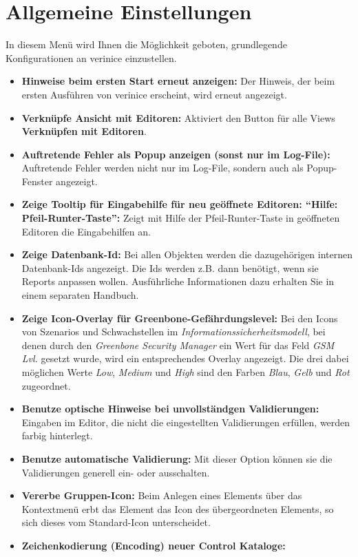 \documentclass[a4paper,10pt]{book}
\begin{document}
\section{Allgemeine Einstellungen}
In diesem Menü wird Ihnen die Möglichkeit geboten, grundlegende
Konfigurationen an verinice einzustellen.
\begin{itemize}
\item \textbf{Hinweise beim ersten Start erneut anzeigen:} Der
  Hinweis, der beim ersten Ausführen von verinice erscheint, wird
  erneut angezeigt.
\item \textbf{Verknüpfe Ansicht mit Editoren:} Aktiviert den Button
  für alle Views \textbf{Verknüpfen mit Editoren}.
\item \textbf{Auftretende Fehler als Popup anzeigen (sonst nur im
    Log-File):} Auftretende Fehler werden nicht nur im Log-File,
  sondern auch als Popup-Fenster angezeigt.
\item \textbf{Zeige Tooltip für Eingabehilfe für neu geöffnete
    Editoren: ``Hilfe: Pfeil-Runter-Taste'':} Zeigt mit Hilfe der
  Pfeil-Runter-Taste in geöffneten Editoren die Eingabehilfen an.
\item \textbf{Zeige Datenbank-Id:} Bei allen Objekten werden die
  dazugehörigen internen Datenbank-Ids angezeigt. Die Ids werden
  z.B. dann benötigt, wenn sie Reports anpassen wollen. Ausführliche
  Informationen dazu erhalten Sie in einem separaten Handbuch.
\item \textbf{Zeige Icon-Overlay für Greenbone-Gefährdungslevel:} Bei
  den Icons von Szenarios und Schwachstellen im {\em
    Informationssicherheitsmodell}, bei denen durch den {\em Greenbone
    Security Manager} ein Wert für das Feld {\em GSM Lvl.} gesetzt
  wurde, wird ein entsprechendes Overlay angezeigt. Die drei dabei
  möglichen Werte {\em Low}, {\em Medium} und {\em High} sind den
  Farben {\em Blau}, {\em Gelb} und {\em Rot} zugeordnet.
\item \textbf{Benutze optische Hinweise bei unvollständgen
    Validierungen:} Eingaben im Editor, die nicht die eingestellten
  Validierungen erfüllen, werden farbig hinterlegt.
\item \textbf{Benutze automatische Validierung:} Mit dieser Option
  können sie die Validierungen generell ein- oder ausschalten.
\item \textbf{Vererbe Gruppen-Icon:} Beim Anlegen eines Elements über
  das Kontextmenü erbt das Element das Icon des übergeordneten
  Elements, so sich dieses vom Standard-Icon unterscheidet.
\item \textbf{Zeichenkodierung (Encoding) neuer Control Kataloge:}

\end{itemize}
\end{document}
